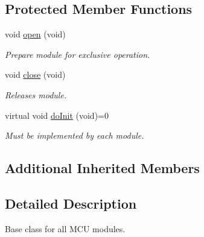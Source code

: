 \subsection*{Protected Member Functions}
\begin{DoxyCompactItemize}
\item 
\hypertarget{classyahal_1_1mcu_1_1details_1_1_base_module_a0237a22e9f1662107cdfa4ec252e46c0}{}void \hyperlink{classyahal_1_1mcu_1_1details_1_1_base_module_a0237a22e9f1662107cdfa4ec252e46c0}{open} (void)\label{classyahal_1_1mcu_1_1details_1_1_base_module_a0237a22e9f1662107cdfa4ec252e46c0}

\begin{DoxyCompactList}\small\item\em Prepare module for exclusive operation. \end{DoxyCompactList}\item 
\hypertarget{classyahal_1_1mcu_1_1details_1_1_base_module_aa28ac444ca2c3194b30038b33da39cd7}{}void \hyperlink{classyahal_1_1mcu_1_1details_1_1_base_module_aa28ac444ca2c3194b30038b33da39cd7}{close} (void)\label{classyahal_1_1mcu_1_1details_1_1_base_module_aa28ac444ca2c3194b30038b33da39cd7}

\begin{DoxyCompactList}\small\item\em Releases module. \end{DoxyCompactList}\item 
\hypertarget{classyahal_1_1mcu_1_1details_1_1_base_module_ab4333f0c7df8ae0bcf114fa206380ca5}{}virtual void \hyperlink{classyahal_1_1mcu_1_1details_1_1_base_module_ab4333f0c7df8ae0bcf114fa206380ca5}{do\+Init} (void)=0\label{classyahal_1_1mcu_1_1details_1_1_base_module_ab4333f0c7df8ae0bcf114fa206380ca5}

\begin{DoxyCompactList}\small\item\em Must be implemented by each module. \end{DoxyCompactList}\end{DoxyCompactItemize}
\subsection*{Additional Inherited Members}


\subsection{Detailed Description}
Base class for all M\+C\+U modules. 

